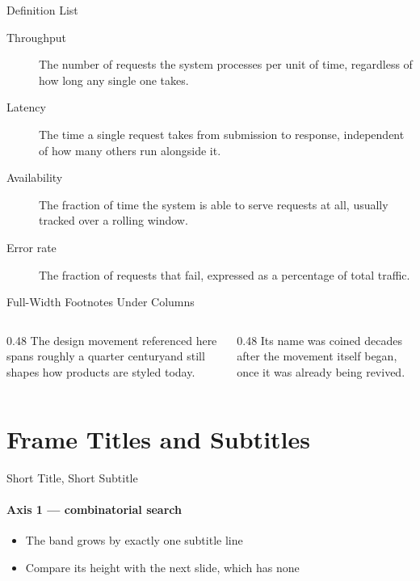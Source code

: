 \documentclass[aspectratio=169]{beamer}
\begin{document}
\begin{frame}{Definition List}
  \begin{description}
    \item[Throughput] The number of requests the system processes per
      unit of time, regardless of how long any single one takes.
    \item[Latency] The time a single request takes from submission to
      response, independent of how many others run alongside it.
    \item[Availability] The fraction of time the system is able to
      serve requests at all, usually tracked over a rolling window.
    \item[Error rate] The fraction of requests that fail, expressed as
      a percentage of total traffic.
  \end{description}
\end{frame}

\begin{frame}{Full-Width Footnotes Under Columns}
  \begin{columns}[T]
    \begin{column}{0.48\textwidth}
      The design movement referenced here spans roughly a quarter
      century\footnotemark[1] and still shapes how products are
      styled today.
    \end{column}
    \begin{column}{0.48\textwidth}
      Its name was coined decades after the movement itself
      began\footnotemark[2], once it was already being revived.
    \end{column}
  \end{columns}
\end{frame}


\section{Frame Titles and Subtitles}

\begin{frame}{Short Title, Short Subtitle}
  \framesubtitle{Axis 1 — combinatorial search}
  \begin{itemize}
    \item The band grows by exactly one subtitle line
    \item Compare its height with the next slide, which has none
  \end{itemize}
\end{frame}
\end{document}
